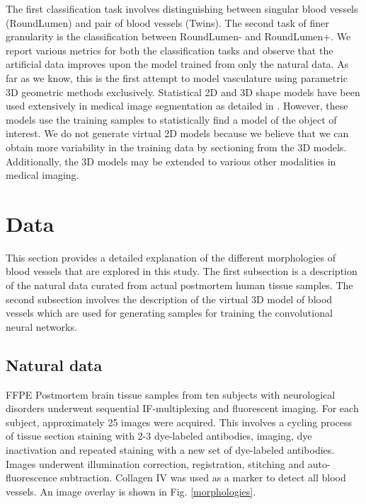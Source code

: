 The first classification task involves distinguishing between singular blood vessels (RoundLumen) and pair of blood vessels (Twins). The second task of finer granularity is the classification between RoundLumen- and RoundLumen+. We report various metrics for both the classification tasks and observe that the artificial data improves upon the model trained from only the natural data.
As far as we know, this is the first attempt to model vasculature using parametric 3D geometric methods exclusively. Statistical 2D and 3D shape models have been used extensively in medical image segmentation as detailed in \cite{heimann2009statistical}. However, these models use the training samples to statistically find a model of the object of interest. We do not generate virtual 2D models because we believe that we can obtain more variability in the training data by sectioning from the 3D models. Additionally, the 3D models may be extended to various other modalities in medical imaging. 

\section{Data}

This section provides a detailed explanation of the different morphologies of blood vessels that are explored in this study. The first subsection is a description of the natural data curated from actual postmortem human tissue samples. The second subsection involves the description of the virtual 3D model of blood vessels which are used for generating samples for training the convolutional neural networks.

\subsection{Natural data}
FFPE Postmortem brain tissue samples from ten subjects with neurological disorders underwent sequential IF-multiplexing and fluorescent imaging. For each subject, approximately 25 images were acquired.   This involves a cycling process of tissue section staining with 2-3 dye-labeled antibodies, imaging, dye inactivation and repeated staining with a new set of dye-labeled antibodies. Images underwent illumination correction, registration, stitching and auto-fluorescence subtraction. Collagen IV was used as a marker to detect all blood vessels. An image overlay is shown in Fig. \ref{morphologies}.

